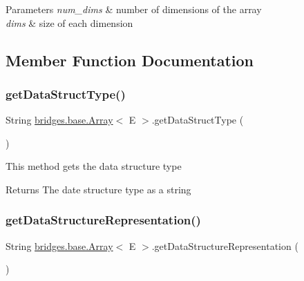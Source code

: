 \begin{DoxyParams}{Parameters}
{\em num\+\_\+dims} & number of dimensions of the array \\
\hline
{\em dims} & size of each dimension \\
\hline
\end{DoxyParams}


\subsection{Member Function Documentation}
\mbox{\label{classbridges_1_1base_1_1_array_ad138b9787d46d053d6bd324b344be9a6}} 
\subsubsection{\texorpdfstring{getDataStructType()}{getDataStructType()}}
{\footnotesize\ttfamily String \mbox{\hyperlink{classbridges_1_1base_1_1_array}{bridges.\+base.\+Array}}$<$ E $>$.get\+Data\+Struct\+Type (\begin{DoxyParamCaption}{ }\end{DoxyParamCaption})}

This method gets the data structure type

\begin{DoxyReturn}{Returns}
The date structure type as a string 
\end{DoxyReturn}
\mbox{\label{classbridges_1_1base_1_1_array_a111592e8b75202064bdf06d9c2234d74}} 
\subsubsection{\texorpdfstring{getDataStructureRepresentation()}{getDataStructureRepresentation()}}
{\footnotesize\ttfamily String \mbox{\hyperlink{classbridges_1_1base_1_1_array}{bridges.\+base.\+Array}}$<$ E $>$.get\+Data\+Structure\+Representation (\begin{DoxyParamCaption}{ }\end{DoxyParamCaption})}

